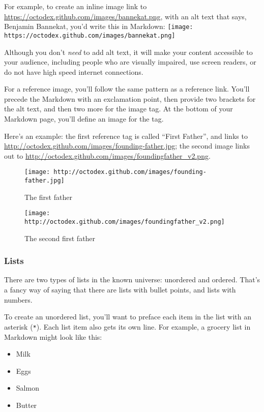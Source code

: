 \documentclass[
]{article}
\providecommand{\tightlist}{%
  \setlength{\itemsep}{0pt}\setlength{\parskip}{0pt}}
\begin{document}
For example, to create an inline image link to
\url{https://octodex.github.com/images/bannekat.png}, with an alt text
that says, Benjamin Bannekat, you'd write this in Markdown:
\texttt{[image: https://octodex.github.com/images/bannekat.png]}

Although you don't \emph{need} to add alt text, it will make your
content accessible to your audience, including people who are visually
impaired, use screen readers, or do not have high speed internet
connections.

For a reference image, you'll follow the same pattern as a reference
link. You'll precede the Markdown with an exclamation point, then
provide two brackets for the alt text, and then two more for the image
tag. At the bottom of your Markdown page, you'll define an image for the
tag.

Here's an example: the first reference tag is called ``First Father'',
and links to \url{http://octodex.github.com/images/founding-father.jpg};
the second image links out to
\url{http://octodex.github.com/images/foundingfather_v2.png}.

\begin{figure}
\centering
\texttt{[image: http://octodex.github.com/images/founding-father.jpg]}
\caption{The first father}
\end{figure}

\begin{figure}
\centering
\texttt{[image: http://octodex.github.com/images/foundingfather\_v2.png]}
\caption{The second first father}
\end{figure}

\hypertarget{lists}{%
\subsubsection{Lists}\label{lists}}

There are two types of lists in the known universe: unordered and
ordered. That's a fancy way of saying that there are lists with bullet
points, and lists with numbers.

To create an unordered list, you'll want to preface each item in the
list with an asterisk (\texttt{*}). Each list item also gets its own
line. For example, a grocery list in Markdown might look like this:

\begin{itemize}
\tightlist
\item
  Milk
\item
  Eggs
\item
  Salmon
\item
  Butter
\end{itemize}
\end{document}
